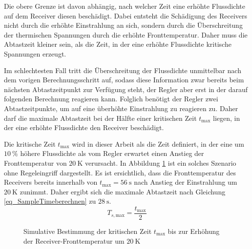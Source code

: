Die obere Grenze ist davon abhängig, nach welcher Zeit eine erhöhte Flussdichte auf dem Receiver diesen beschädigt.
Dabei entsteht die Schädigung des Receivers nicht durch die erhöhte Einstrahlung an sich, sondern durch die Überschreitung der thermischen Spannungen durch die erhöhte Fronttemperatur.
Daher muss die Abtastzeit kleiner sein, als die Zeit, in der eine erhöhte Flussdichte kritische Spannungen erzeugt.

Im schlechtesten Fall tritt die Überschreitung der Flussdichte unmittelbar nach dem vorigen Berechnungsschritt auf, sodass diese Information zwar bereits beim nächsten Abtastzeitpunkt zur Verfügung steht, der Regler aber erst in der darauf folgenden Berechnung reagieren kann.
Folglich benötigt der Regler zwei Abtastzeitpunkte, um auf eine überhöhte Einstrahlung zu reagieren zu.
Daher darf die maximale Abtastzeit bei der Hälfte einer kritischen Zeit $t_{\mathrm{max}}$ liegen, in der eine erhöhte Flussdichte den Receiver beschädigt.

Die kritische Zeit $t_{\mathrm{max}}$ wird in dieser Arbeit als die Zeit definiert, in der eine um $\SI{10}{\percent}$ höhere Flussdichte als vom Regler erwartet einen Anstieg der Fronttemperatur von $\SI{20}{\kelvin}$ verursacht.
In Abbildung \ref{fig_SampleTimebestimmen} ist ein solches Szenario ohne Regeleingriff dargestellt.
Es ist ersichtlich, dass die Fronttemperatur des Receivers bereits innerhalb von $t_{\mathrm{max}} = \SI{56}{\second}$ nach Anstieg der Einstrahlung um $\SI{20}{\kelvin}$ zunimmt.
Daher ergibt sich die maximale Abtastzeit nach Gleichung \ref{eq_SampleTimeberechnen} zu $\SI{28}{\second}$.
\begin{equation} \label{eq_SampleTimeberechnen}
    T_{s, \mathrm{max}} = \frac{t_{\mathrm{max}}}{2}
\end{equation}

\begin{figure}[h!]
    \centering
    \setlength{\fboxsep}{1pt}
    \setlength{\fboxrule}{1pt}
    \caption[Simulative Bestimmung der kritischen Zeit $t_{\mathrm{max}}$ bis zur Erhöhung der Receiver-Fronttemperatur um $\SI{10}{\kelvin}$]{Simulative Bestimmung der kritischen Zeit $t_{\mathrm{max}}$ bis zur Erhöhung der Receiver-Fronttemperatur um $\SI{20}{\kelvin}$}
    \label{fig_SampleTimebestimmen}
\end{figure}

